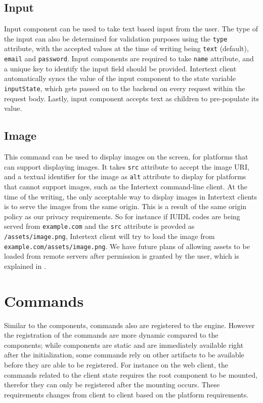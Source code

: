 \subsection{Input}

Input component can be used to take text based input from the user. The type of the input can also be determined for validation purposes using the \texttt{type} attribute, with the accepted values at the time of writing being \texttt{text} (default), \texttt{email} and \texttt{password}. Input components are required to take \texttt{name} attribute, and a unique key to identify the input field should be provided. Intertext client automatically syncs the value of the input component to the state variable \texttt{inputState}, which gets passed on to the backend on every request within the request body. Lastly, input component accepts text as children to pre-populate its value.

\subsection{Image}

This command can be used to display images on the screen, for platforms that can support displaying images. It takes \texttt{src} attribute to accept the image URI, and a textual identifier for the image as \texttt{alt} attribute to display for platforms that cannot support images, such as the Intertext command-line client. At the time of the writing, the only acceptable way to display images in Intertext clients is to serve the images from the same origin. This is a result of the same origin policy as our privacy requirements. So for instance if IUIDL codes are being served from \texttt{example.com} and the \texttt{src} attribute is provded as \texttt{/assets/image.png}, Intertext client will try to load the image from \texttt{example.com/assets/image.png}. We have future plans of allowing assets to be loaded from remote servers after permission is granted by the user, which is explained in .

\section{Commands}

Similar to the components, commands also are registered to the engine. However the registration of the commands are more dynamic compared to the components; while components are static and are immediately available right after the initialization, some commands rely on other artifacts to be available before they are able to be registered. For instance on the web client, the commands related to the client state requires the root component to be mounted, therefor they can only be registered after the mounting occurs. These requirements changes from client to client based on the platform requirements.

